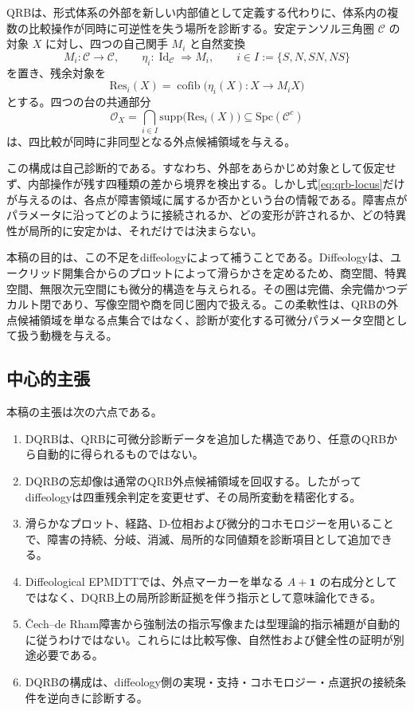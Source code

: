 \documentclass[a4paper,11pt]{ltjsarticle}
\theoremstyle{definition}
\theoremstyle{plain}
\newcommand{\Res}{\mathrm{Res}}
\newcommand{\Spc}{\mathrm{Spc}}
\newcommand{\supp}{\mathrm{supp}}
\newcommand{\cofib}{\operatorname{cofib}}
\newcommand{\Id}{\operatorname{Id}}
\newcommand{\Unit}{\mathbf 1}
\begin{document}
QRBは、形式体系の外部を新しい内部値として定義する代わりに、体系内の複数の比較操作が同時に可逆性を失う場所を診断する。安定テンソル三角圏 $\mathcal C$ の対象 $X$ に対し、四つの自己関手 $M_i$ と自然変換
\begin{equation}
 M_i:\mathcal C\longrightarrow\mathcal C,
 \qquad
 \eta_i:\Id_{\mathcal C}\Longrightarrow M_i,
 \qquad
 i\in I:=\{S,N,SN,NS\}
 \label{eq:qrb-comparisons}
\end{equation}
を置き、残余対象を
\begin{equation}
 \Res_i(X)=\cofib\bigl(\eta_i(X):X\to M_iX\bigr)
 \label{eq:residual}
\end{equation}
とする。四つの台の共通部分
\begin{equation}
 \mathcal O_X=
 \bigcap_{i\in I}\supp\bigl(\Res_i(X)\bigr)
 \subseteq \Spc(\mathcal C^c)
 \label{eq:qrb-locus}
\end{equation}
は、四比較が同時に非同型となる外点候補領域を与える\cite{ChibaQRB2026,balmer}。

この構成は自己診断的である。すなわち、外部をあらかじめ対象として仮定せず、内部操作が残す四種類の差から境界を検出する。しかし式\eqref{eq:qrb-locus}だけが与えるのは、各点が障害領域に属するか否かという台の情報である。障害点がパラメータに沿ってどのように接続されるか、どの変形が許されるか、どの特異性が局所的に安定かは、それだけでは決まらない。

本稿の目的は、この不足をdiffeologyによって補うことである。Diffeologyは、ユークリッド開集合からのプロットによって滑らかさを定めるため、商空間、特異空間、無限次元空間にも微分的構造を与えられる\cite{IglesiasZemmour2025Why,Kihara2018,ChristensenWu2014}。その圏は完備、余完備かつデカルト閉であり、写像空間や商を同じ圏内で扱える。この柔軟性は、QRBの外点候補領域を単なる点集合ではなく、診断が変化する可微分パラメータ空間として扱う動機を与える。

\subsection{中心的主張}

本稿の主張は次の六点である。
\begin{enumerate}
 \item DQRBは、QRBに可微分診断データを追加した構造であり、任意のQRBから自動的に得られるものではない。
 \item DQRBの忘却像は通常のQRB外点候補領域を回収する。したがってdiffeologyは四重残余判定を変更せず、その局所変動を精密化する。
 \item 滑らかなプロット、経路、D-位相および微分的コホモロジーを用いることで、障害の持続、分岐、消滅、局所的な同値類を診断項目として追加できる。
 \item Diffeological EPMDTTでは、外点マーカーを単なる $A+\Unit$ の右成分としてではなく、DQRB上の局所診断証拠を伴う指示として意味論化できる。
 \item \v{C}ech--de Rham障害から強制法の指示写像または型理論的指示補題が自動的に従うわけではない。これらには比較写像、自然性および健全性の証明が別途必要である。
 \item DQRBの構成は、diffeology側の実現・支持・コホモロジー・点選択の接続条件を逆向きに診断する。
\end{enumerate}
\end{document}
